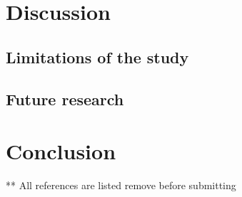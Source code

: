 \documentclass{master_thesis}
\begin{document}
\section{Discussion}
	\subsection{Limitations of the study}
	\subsection{Future research}
\section*{Conclusion}


\nocite{*}
\printbibliography
** All references are listed remove before submitting
\end{document}
